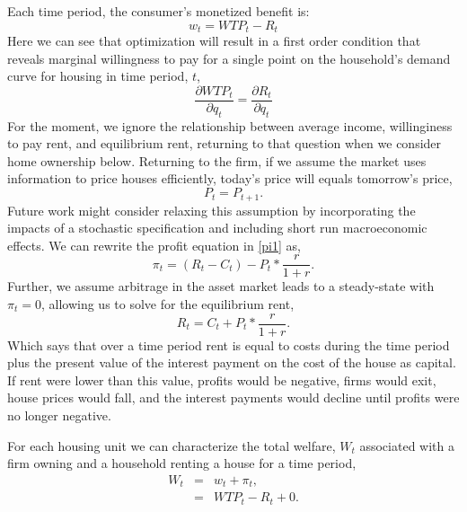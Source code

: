 \documentclass[ecta,nameyear,draft]{econsocart}
\theoremstyle{plain}
\theoremstyle{remark}
\begin{document}
Each time period, the consumer’s monetized benefit is:
\begin{equation*}
	 w_t=\mathit{WTP}_t-R_t
\end{equation*}
Here we can see that optimization will result in a first order condition that reveals marginal willingness
to pay for a single point on the household’s demand curve for housing in time period, $t$,
\begin{equation}
	\frac{\partial \mathit{WTP}_t}{\partial q_t}=\frac{\partial R_t}{\partial q_t} \label{foc}
\end{equation}
For the moment, we ignore the relationship between average income, willinginess to pay rent, and equilibrium rent, returning to that question when we consider home ownership below. Returning to the firm, if we assume the market uses information to price houses efficiently, today’s price will equals tomorrow’s
price,
\begin{equation*}
	P_t=P_{t+1}.
\end{equation*}
Future work might consider relaxing this assumption by incorporating the impacts of a stochastic
specification and including short run macroeconomic effects.
We can rewrite the profit equation in \ref{pi1} as,
\begin{equation}
	\pi_t=(R_t-C_t)-P_t*\frac{r}{1+r}.\label{pi1.1}
\end{equation}
Further, we assume arbitrage in the asset market leads to a steady-state with $\pi_t=0$, allowing us to solve for the equilibrium rent,
\begin{equation*}
	R_t=C_t+P_t*\frac{r}{1+r}.
\end{equation*}
Which says that over a time period rent is equal to costs during the time period plus the present value of
the interest payment on the cost of the house as capital. If rent were lower than this value, profits
would be negative, firms would exit, house prices would fall, and the interest payments would decline until profits were no longer negative.

For each housing unit we can characterize the total welfare, $W_t$ associated with a firm owning and a household renting a house for a time period,
\begin{eqnarray*}
	W_t & = & w_t+\pi_t,\\
	& = & \mathit{WTP}_t-R_t+0.
\end{eqnarray*}
\end{document}
